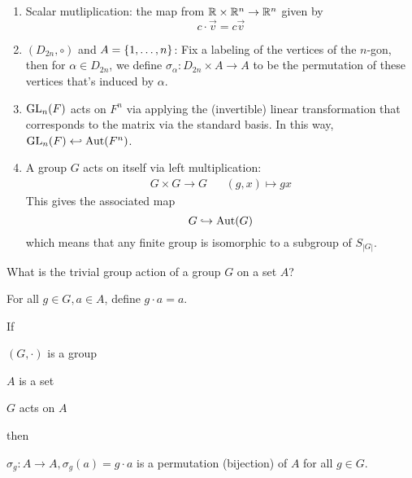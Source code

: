 \documentclass[a5paper]{article}
\begin{document}
\begin{example}
	\begin{enumerate}%
    \item Scalar mutliplication: the map from $\mathbb{R}\times \mathbb{R}^n\to\mathbb{R}^n$
    given by
    \begin{equation*}
      c\cdot\vec{v}=c\vec{v}
    \end{equation*}
    \item $(D_{2n},\circ)$ and $A=\left\{1,\ldots,n\right\}$: Fix a labeling of the
      vertices of the $n$-gon, then for $\alpha\in D_{2n}$, we define
      $\sigma_\alpha:D_{2n}\times A\to A$ to be the permutation of these
      vertices that's induced by $\alpha$.
    \item $\mathrm{GL}_n(F)$ acts on $F^n$ via applying the (invertible) linear
      transformation that corresponds to the matrix via the standard basis. In
      this way, $\mathrm{GL}_n(F)\hookleftarrow\operatorname{Aut}(F^n)$.
    \item A group $G$ acts on itself via left multiplication:
      \begin{align*}
        G\times G\longrightarrow G && (g,x)\longmapsto gx
      \end{align*}
      This gives the associated map
      \begin{equation*}
        G\hookrightarrow \operatorname{Aut}(G)
      \end{equation*}
      which means that any finite group is isomorphic to a subgroup of $S_{|G|}$.
  \end{enumerate}
\end{example}

\begin{note}
  \begin{field}
    What is the trivial group action of a group $G$ on a set $A$?
  \end{field}

  \begin{field}
    For all $g\in G,a\in A$, define $g\cdot a=a$.
  \end{field}
\end{note}

\begin{theorem}
  If
  \begin{premises}
    \item $(G,\cdot)$ is a group
    \item $A$ is a set
    \item $G$ acts on $A$
  \end{premises}
  then
  \begin{conclusion}
    $\sigma_g:A\to A,\sigma_g(a)=g\cdot a$ is a permutation (bijection) of $A$
    for all $g\in G$.
  \end{conclusion}
\end{theorem}
\end{document}

